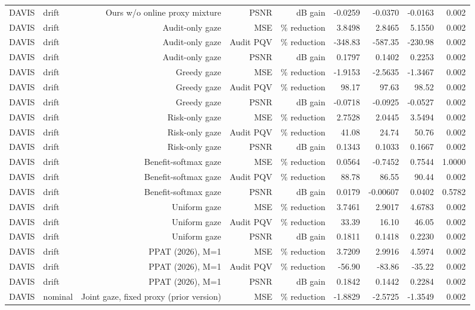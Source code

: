 \begin{table}[t]
\begin{tabular}{llrrrrrrr}
DAVIS & drift & Ours w/o online proxy mixture & PSNR & dB gain & -0.0259 & -0.0370 & -0.0163 & 0.002 \\
DAVIS & drift & Audit-only gaze & MSE & \% reduction & 3.8498 & 2.8465 & 5.1550 & 0.002 \\
DAVIS & drift & Audit-only gaze & Audit PQV & \% reduction & -348.83 & -587.35 & -230.98 & 0.002 \\
DAVIS & drift & Audit-only gaze & PSNR & dB gain & 0.1797 & 0.1402 & 0.2253 & 0.002 \\
DAVIS & drift & Greedy gaze & MSE & \% reduction & -1.9153 & -2.5635 & -1.3467 & 0.002 \\
DAVIS & drift & Greedy gaze & Audit PQV & \% reduction & 98.17 & 97.63 & 98.52 & 0.002 \\
DAVIS & drift & Greedy gaze & PSNR & dB gain & -0.0718 & -0.0925 & -0.0527 & 0.002 \\
DAVIS & drift & Risk-only gaze & MSE & \% reduction & 2.7528 & 2.0445 & 3.5494 & 0.002 \\
DAVIS & drift & Risk-only gaze & Audit PQV & \% reduction & 41.08 & 24.74 & 50.76 & 0.002 \\
DAVIS & drift & Risk-only gaze & PSNR & dB gain & 0.1343 & 0.1033 & 0.1667 & 0.002 \\
DAVIS & drift & Benefit-softmax gaze & MSE & \% reduction & 0.0564 & -0.7452 & 0.7544 & 1.0000 \\
DAVIS & drift & Benefit-softmax gaze & Audit PQV & \% reduction & 88.78 & 86.55 & 90.44 & 0.002 \\
DAVIS & drift & Benefit-softmax gaze & PSNR & dB gain & 0.0179 & -0.00607 & 0.0402 & 0.5782 \\
DAVIS & drift & Uniform gaze & MSE & \% reduction & 3.7461 & 2.9017 & 4.6783 & 0.002 \\
DAVIS & drift & Uniform gaze & Audit PQV & \% reduction & 33.39 & 16.10 & 46.05 & 0.002 \\
DAVIS & drift & Uniform gaze & PSNR & dB gain & 0.1811 & 0.1418 & 0.2230 & 0.002 \\
DAVIS & drift & PPAT (2026), M=1 & MSE & \% reduction & 3.7209 & 2.9916 & 4.5974 & 0.002 \\
DAVIS & drift & PPAT (2026), M=1 & Audit PQV & \% reduction & -56.90 & -83.86 & -35.22 & 0.002 \\
DAVIS & drift & PPAT (2026), M=1 & PSNR & dB gain & 0.1842 & 0.1442 & 0.2284 & 0.002 \\
DAVIS & nominal & Joint gaze, fixed proxy (prior version) & MSE & \% reduction & -1.8829 & -2.5725 & -1.3549 & 0.002 \\

\end{tabular}
\end{table}
